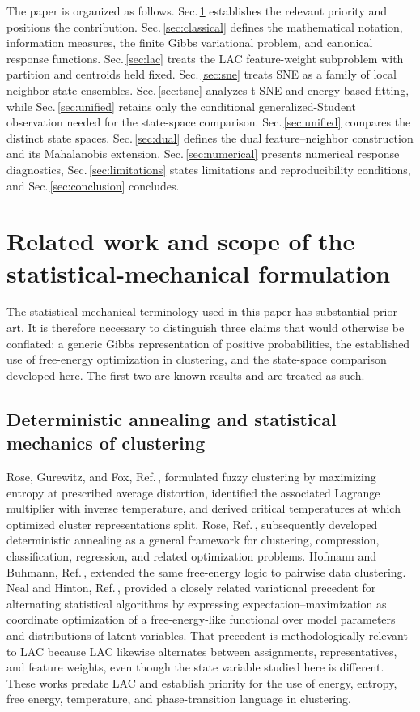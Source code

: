 \documentclass[11pt,a4paper]{article}
\theoremstyle{definition}
\theoremstyle{plain}
\begin{document}
The paper is organized as follows. Sec.\,\ref{sec:related} establishes the relevant priority and positions the contribution. Sec.\,\ref{sec:classical} defines the mathematical notation, information measures, the finite Gibbs variational problem, and canonical response functions. Sec.\,\ref{sec:lac} treats the LAC feature-weight subproblem with partition and centroids held fixed. Sec.\,\ref{sec:sne} treats SNE as a family of local neighbor-state ensembles. Sec.\,\ref{sec:tsne} analyzes t-SNE and energy-based fitting, while Sec.\,\ref{sec:unified} retains only the conditional generalized-Student observation needed for the state-space comparison. Sec.\,\ref{sec:unified} compares the distinct state spaces. Sec.\,\ref{sec:dual} defines the dual feature--neighbor construction and its Mahalanobis extension. Sec.\,\ref{sec:numerical} presents numerical response diagnostics, Sec.\,\ref{sec:limitations} states limitations and reproducibility conditions, and Sec.\,\ref{sec:conclusion} concludes.

\section{Related work and scope of the statistical-mechanical formulation}
\label{sec:related}

The statistical-mechanical terminology used in this paper has substantial prior art. It is therefore necessary to distinguish three claims that would otherwise be conflated: a generic Gibbs representation of positive probabilities, the established use of free-energy optimization in clustering, and the state-space comparison developed here. The first two are known results and are treated as such.

\subsection{Deterministic annealing and statistical mechanics of clustering}
\label{subsec:deterministic_annealing}

Rose, Gurewitz, and Fox, Ref.\,\cite{rose1990phase}, formulated fuzzy clustering by maximizing entropy at prescribed average distortion, identified the associated Lagrange multiplier with inverse temperature, and derived critical temperatures at which optimized cluster representations split. Rose, Ref.\,\cite{rose1998annealing}, subsequently developed deterministic annealing as a general framework for clustering, compression, classification, regression, and related optimization problems. Hofmann and Buhmann, Ref.\,\cite{hofmann1997pairwise}, extended the same free-energy logic to pairwise data clustering. Neal and Hinton, Ref.\,\cite{neal1998em}, provided a closely related variational precedent for alternating statistical algorithms by expressing expectation--maximization as coordinate optimization of a free-energy-like functional over model parameters and distributions of latent variables. That precedent is methodologically relevant to LAC because LAC likewise alternates between assignments, representatives, and feature weights, even though the state variable studied here is different. These works predate LAC and establish priority for the use of energy, entropy, free energy, temperature, and phase-transition language in clustering.
\end{document}
